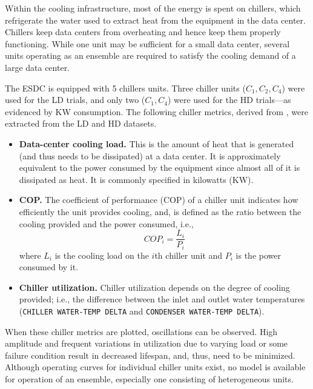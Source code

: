 Within the cooling infrastructure, most of the energy is spent on chillers, which refrigerate the water used to extract heat from the equipment in the data center.
 Chillers keep data centers from overheating and hence keep them properly functioning.
 While one unit may be sufficient for a small data center, several units operating as an ensemble are required to satisfy the cooling demand of a large data center.

  The ESDC is equipped with 5 chillers units. 
 Three chiller units ($C_1,C_2,C_4$) were used for the LD trials, and only two ($C_1,C_4$) were used for the HD trials---as evidenced by KW consumption. 
The following chiller metrics, derived from \cite{Patnaik2011}, were extracted from the LD and HD datasets.
 \begin{itemize}
   \item
   {\bf Data-center cooling load.} This is the amount of heat that is generated (and thus needs to be dissipated) at a data center. It is approximately equivalent to the power consumed by the equipment since almost all of it is dissipated as heat. It is commonly specified in kilowatts (KW).
 \item
   {\bf COP.} The coefficient of performance (COP) of a chiller unit indicates how efficiently the unit provides cooling, and, is defined as the ratio between the cooling provided and the power consumed, i.e.,
   \begin{equation*}
     COP_i = \frac{L_i}{P_i}\label{cop}
 \end{equation*}
where $L_i$ is the cooling load on the $i$th chiller unit and $P_i$ is the power consumed by it.
\item {\bf Chiller utilization.} Chiller utilization depends on the degree of cooling provided; i.e., the difference between the inlet and outlet water temperatures ({\tt CHILLER WATER-TEMP DELTA} and {\tt CONDENSER WATER-TEMP DELTA}).
\end{itemize}

When these chiller metrics are plotted, oscillations can be observed.
     High amplitude and frequent variations in utilization due to varying load or some failure condition result in decreased lifespan, and, thus, need to be minimized.
 Although operating curves for individual chiller units exist, no model is available for operation of an ensemble, especially one consisting of heterogeneous units.



